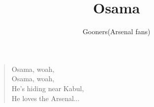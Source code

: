 \documentclass[a4paper,12pt]{article}
\title{Osama}
\author{Gooners(Arsenal fans)}
\date{}
\begin{document}
	
	\maketitle
	
	\begin{verse}
		
		Osama, woah, \\
		Osama, woah, \\
		He's hiding near Kabul, \\
		He loves the Arsenal$\ldots$
		
	\end{verse}
	
\end{document}
